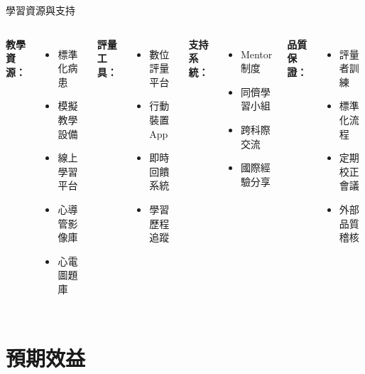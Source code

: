 \documentclass[aspectratio=169]{beamer}
\begin{document}
\begin{frame}{學習資源與支持}
\begin{columns}[c]
\textbf{教學資源：}
\begin{itemize}
\item 標準化病患
\item 模擬教學設備
\item 線上學習平台
\item 心導管影像庫
\item 心電圖題庫
\end{itemize}

\textbf{評量工具：}
\begin{itemize}
\item 數位評量平台
\item 行動裝置App
\item 即時回饋系統
\item 學習歷程追蹤
\end{itemize}

\textbf{支持系統：}
\begin{itemize}
\item Mentor制度
\item 同儕學習小組
\item 跨科際交流
\item 國際經驗分享
\end{itemize}

\textbf{品質保證：}
\begin{itemize}
\item 評量者訓練
\item 標準化流程
\item 定期校正會議
\item 外部品質稽核
\end{itemize}
\end{columns}
\end{frame}

\section{預期效益}
\end{document}
